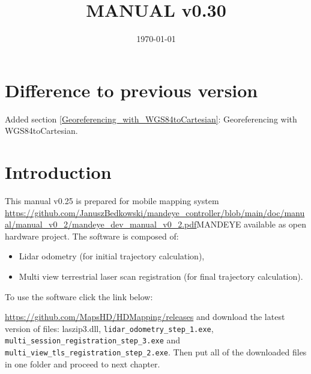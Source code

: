 \documentclass[a4paper,12pt]{book}
\begin{document}
\author{}
\title{MANUAL v0.30}
\date{\today}

\frontmatter
\maketitle
\tableofcontents

\mainmatter

\chapter{Difference to previous version}
Added section \ref{Georeferencing_with_WGS84toCartesian}: Georeferencing with WGS84toCartesian.

\chapter{Introduction}
This manual v0.25 is prepared for mobile mapping system \url{https://github.com/JanuszBedkowski/mandeye_controller/blob/main/doc/manual/manual_v0_2/mandeye_dev_manual_v0_2.pdf}{MANDEYE} available as open hardware project.
The software is composed of:
\begin{itemize}
	\item Lidar odometry (for initial trajectory calculation),
	\item Multi view terrestrial laser scan registration (for final trajectory calculation).
\end{itemize}
To use the software click the link below:

\url{https://github.com/MapsHD/HDMapping/releases}
\linebreak
and download the latest version of files: laszip3.dll, \verb|lidar_odometry_step_1.exe|, \verb|multi_session_registration_step_3.exe|  and \verb|multi_view_tls_registration_step_2.exe|.
Then put all of the downloaded files in one folder and proceed to next chapter.













\backmatter
\end{document}
